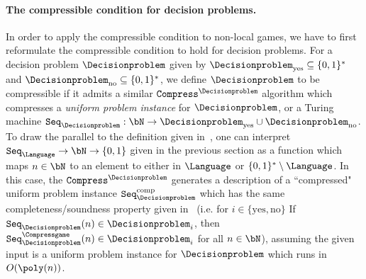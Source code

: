 
\paragraph{The compressible condition for decision problems.} In order to apply the compressible condition to non-local games, we have to first reformulate the compressible condition to hold for decision problems. For a decision problem $\Decisionproblem$ given by $\Decisionproblem_{\text{yes}} \subseteq \{0,1\}^*$ and $\Decisionproblem_{\text{no}} \subseteq \{0,1\}^*$, we define $\Decisionproblem$ to be compressible if it admits a similar $\texttt{Compress}^{\Decisionproblem}$ algorithm which compresses a \textit{uniform problem instance} for $\Decisionproblem$, or a Turing machine $\texttt{Seq}_{\Decisionproblem}: \bN \rightarrow \Decisionproblem_{\text{yes}} \cup \Decisionproblem_{\text{no}}$. To draw the parallel to the definition given in~, one can interpret $\texttt{Seq}_{\Language} \rightarrow \bN \rightarrow \{0,1\}$ given in the previous section as a function which  maps $n \in \bN$ to an element to either in $\Language$ or $\{0,1\}^* \setminus \Language$. In this case, the $\texttt{Compress}^{\Decisionproblem}$ generates a description of a ``compressed" uniform problem instance $\texttt{Seq}_{\Decisionproblem}^{\text{comp}}$ which has the same completeness/soundness property given in~ (i.e. for $i \in \{\text{yes}, \text{no}\}$ If $\texttt{Seq}_{\Decisionproblem}(n) \in \Decisionproblem_{i}$, then $\texttt{Seq}_{\Decisionproblem}^{\Compressgame}(n) \in \Decisionproblem_{i}$ for all $n \in \bN$), assuming the given input is a uniform problem instance for $\Decisionproblem$ which runs in $O(\poly(n))$.

